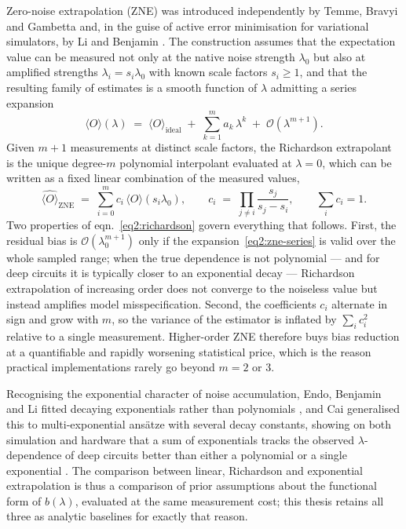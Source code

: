 \documentclass[Thesis.tex]{subfiles}
\begin{document}
Zero-noise extrapolation (ZNE) was introduced independently by Temme, Bravyi
and Gambetta \cite{temme2017error} and, in the guise of active error
minimisation for variational simulators, by Li and Benjamin
\cite{li2017efficient}. The construction assumes that the expectation value
can be measured not only at the native noise strength $\lambda_{0}$ but also at
amplified strengths $\lambda_{i} = s_{i}\lambda_{0}$ with known scale factors
$s_{i} \ge 1$, and that the resulting family of estimates is a smooth function
of $\lambda$ admitting a series expansion
\begin{equation}
  \langle O\rangle(\lambda) \;=\; \langle O\rangle_{\mathrm{ideal}}
  \;+\; \sum_{k=1}^{m} a_{k}\,\lambda^{k} \;+\; \mathcal{O}(\lambda^{m+1}).
  \label{eq2:zne-series}
\end{equation}
Given $m+1$ measurements at distinct scale factors, the Richardson
extrapolant is the unique degree-$m$ polynomial interpolant evaluated at
$\lambda = 0$, which can be written as a fixed linear combination of the
measured values,
\begin{equation}
  \widehat{\langle O\rangle}_{\mathrm{ZNE}} \;=\; \sum_{i=0}^{m} c_{i}\,\langle O\rangle(s_{i}\lambda_{0}),
  \qquad
  c_{i} \;=\; \prod_{j \ne i} \frac{s_{j}}{s_{j}-s_{i}},
  \qquad \sum_{i} c_{i} = 1 .
  \label{eq2:richardson}
\end{equation}
Two properties of eqn.~\eqref{eq2:richardson} govern everything that follows.
First, the residual bias is
$\mathcal{O}(\lambda_{0}^{m+1})$ only if the expansion~\eqref{eq2:zne-series}
is valid over the whole sampled range; when the true dependence is not
polynomial --- and for deep circuits it is typically closer to an exponential
decay --- Richardson extrapolation of increasing order does not converge to
the noiseless value but instead amplifies model misspecification. Second, the
coefficients $c_{i}$ alternate in sign and grow with $m$, so the variance
of the estimator is inflated by
$\sum_{i}c_{i}^{2}$ relative to a single measurement. Higher-order ZNE
therefore buys bias reduction at a quantifiable and rapidly worsening
statistical price, which is the reason practical implementations rarely go
beyond $m = 2$ or $3$.

Recognising the exponential character of noise accumulation, Endo, Benjamin and
Li fitted decaying exponentials rather than polynomials
\cite{endo2018practical}, and Cai generalised this to multi-exponential
ans\"atze with several decay constants, showing on both simulation and hardware
that a sum of exponentials tracks the observed $\lambda$-dependence of deep
circuits better than either a polynomial or a single exponential
\cite{cai2021multiexponential}. The comparison between linear, Richardson and
exponential extrapolation is thus a comparison of prior assumptions about the
functional form of $b(\lambda)$, evaluated at the same measurement cost; this
thesis retains all three as analytic baselines for exactly that reason.
\end{document}
